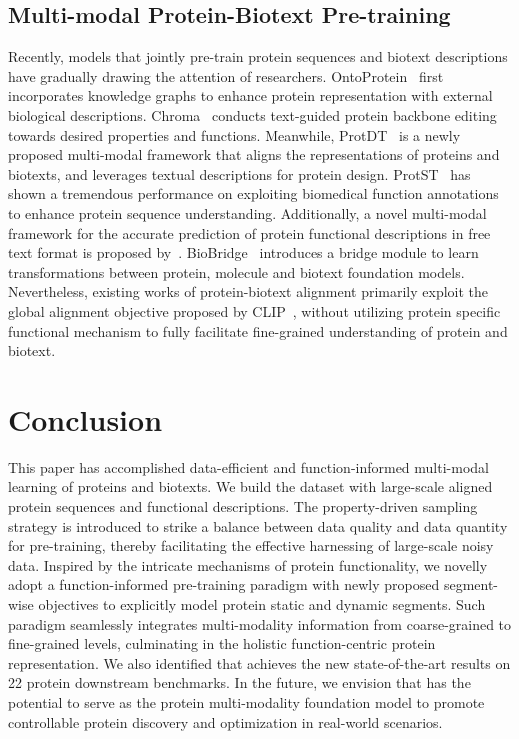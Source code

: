\subsection{Multi-modal Protein-Biotext Pre-training}
Recently, models that jointly pre-train protein sequences and biotext descriptions have gradually drawing the attention of researchers. OntoProtein~\cite{OntoProtein} first incorporates knowledge graphs to enhance protein representation with external biological descriptions. 
Chroma~\cite{chroma} conducts text-guided protein backbone editing towards desired properties and functions. Meanwhile, ProtDT~\cite{ProtDT} is a newly proposed multi-modal framework that aligns the representations of proteins and biotexts, and leverages textual descriptions 
for protein design. ProtST~\cite{ProtST} has shown a tremendous performance on exploiting biomedical function annotations to enhance protein sequence understanding. Additionally, a novel multi-modal framework for the accurate prediction of protein functional descriptions in free text format is proposed by~\cite{Prot2Text}. BioBridge~\cite{BioBridge} introduces a bridge module to learn transformations between protein, molecule and biotext foundation models. Nevertheless, existing works of protein-biotext alignment primarily exploit the global alignment objective proposed by CLIP~\cite{clip}, without utilizing protein specific functional mechanism to fully facilitate fine-grained understanding of protein and biotext.

\section{Conclusion}
This paper has accomplished data-efficient and function-informed multi-modal learning of proteins and biotexts. We build the \ourdataset dataset with large-scale aligned protein sequences and functional descriptions. The property-driven sampling strategy is introduced to strike a balance between data quality and data quantity for pre-training, thereby facilitating the effective harnessing of large-scale noisy data. Inspired by the intricate mechanisms of protein functionality, we novelly adopt a function-informed pre-training paradigm with newly proposed segment-wise objectives to explicitly model protein static and dynamic segments. Such paradigm seamlessly integrates multi-modality information from coarse-grained to fine-grained levels, culminating in the holistic function-centric protein representation. We also identified that \ourapproach achieves the new state-of-the-art results on 22 protein downstream benchmarks. In the future, we envision that \ourapproach has the potential to serve as the protein multi-modality foundation model to promote controllable protein discovery and optimization in real-world scenarios. 

